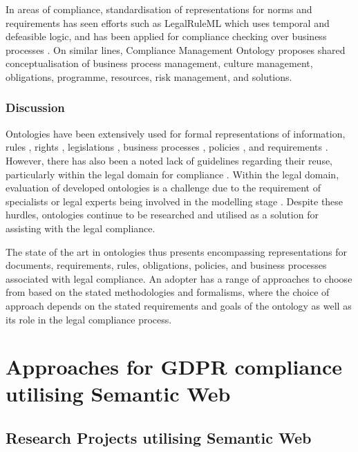 In areas of compliance, standardisation of representations for norms and requirements has seen efforts such as LegalRuleML \cite{palmirani_legalruleml:_2011} which uses temporal and defeasible logic, and has been applied for compliance checking over business processes \cite{governatori_semantic_2016}. On similar lines, Compliance Management Ontology \cite{syed_abdullah_compliance_2012} proposes shared conceptualisation of business process management, culture management, obligations, programme, resources, risk management, and solutions.

\subsubsection{Discussion}
Ontologies have been extensively used for formal representations of information, rules \cite{kirrane_scalable_2018}, rights \cite{pellegrini_genealogy_2018}, legislations \cite{leone_taking_2019}, business processes \cite{elgammal_formalizing_2016}, policies \cite{van_de_ven_qualitative_2016}, and requirements \cite{gharib_ontologies_2016}.
However, there has also been a noted lack of guidelines regarding their reuse, particularly within the legal domain for compliance \cite{casanovas_legal_2017}.
Within the legal domain, evaluation of developed ontologies is a challenge due to the requirement of specialists or legal experts being involved in the modelling stage \cite{rodrigues_legal_2019}.
Despite these hurdles, ontologies continue to be researched and utilised as a solution for assisting with the legal compliance.

The state of the art in ontologies thus presents encompassing representations for documents, requirements, rules, obligations, policies, and business processes associated with legal compliance. An adopter has a range of approaches to choose from based on the stated methodologies and formalisms, where the choice of approach depends on the stated requirements and goals of the ontology as well as its role in the legal compliance process.

\section{Approaches for GDPR compliance utilising Semantic Web}\label{sec:sota:gdpr-semweb}
\subsection{Research Projects utilising Semantic Web}

